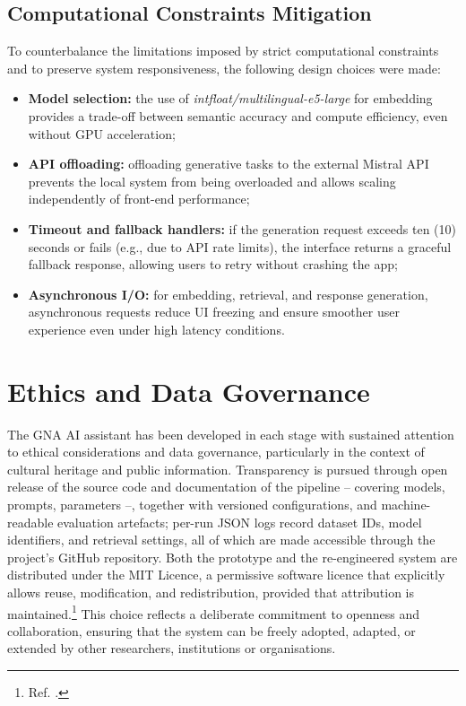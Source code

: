 \begin{spacing}{1.5}
\subsection{Computational Constraints Mitigation}
To counterbalance the limitations imposed by strict computational constraints and to preserve system responsiveness, the following design choices were made:
\begin{itemize}
\item \textbf{Model selection:} the use of \textit{intfloat/multilingual-e5-large} for embedding provides a trade-off between semantic accuracy and compute efficiency, even without GPU acceleration;
\item \textbf{API offloading:} offloading generative tasks to the external Mistral API prevents the local system from being overloaded and allows scaling independently of front-end performance;
\item \textbf{Timeout and fallback handlers:} if the generation request exceeds ten (10) seconds or fails (e.g., due to API rate limits), the interface returns a graceful fallback response, allowing users to retry without crashing the app;
\item \textbf{Asynchronous I/O:} for embedding, retrieval, and response generation, asynchronous requests reduce UI freezing and ensure smoother user experience even under high latency conditions.
\end{itemize}


\section{Ethics and Data Governance}
The GNA AI assistant has been developed in each stage with sustained attention to ethical considerations and data governance, particularly in the context of cultural heritage and public information. Transparency is pursued through open release of the source code and documentation of the pipeline -- covering models, prompts, parameters --, together with versioned configurations, and machine-readable evaluation artefacts; per-run JSON logs record dataset IDs, model identifiers, and retrieval settings, all of which are made accessible through the project’s GitHub repository. Both the prototype and the re-engineered system are distributed under the MIT Licence, a permissive software licence that explicitly allows reuse, modification, and redistribution, provided that attribution is maintained.\footnote{Ref. \textcite{noauthor_exploring_nodate}.} This choice reflects a deliberate commitment to openness and collaboration, ensuring that the system can be freely adopted, adapted, or extended by other researchers, institutions or organisations.


\end{spacing}
